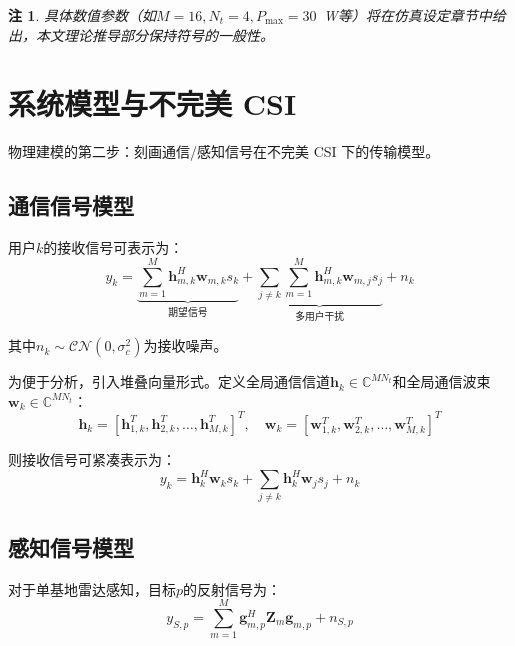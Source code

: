 \documentclass[12pt,a4paper]{article}
\newtheorem{remark}{注}
\newcommand{\vect}[1]{\mathbf{#1}}
\newcommand{\mat}[1]{\mathbf{#1}}
\begin{document}
\begin{remark}
具体数值参数（如$M=16, N_t=4, P_{\max}=30$~W等）将在仿真设定章节中给出，本文理论推导部分保持符号的一般性。
\end{remark}

\section{系统模型与不完美 CSI}

物理建模的第二步：刻画通信/感知信号在不完美 CSI 下的传输模型。

\subsection{通信信号模型}

用户$k$的接收信号可表示为：
\begin{equation}
y_k = \underbrace{\sum_{m=1}^M \vect{h}_{m,k}^H \vect{w}_{m,k} s_k}_{\text{期望信号}} + \underbrace{\sum_{j \neq k} \sum_{m=1}^M \vect{h}_{m,k}^H \vect{w}_{m,j} s_j}_{\text{多用户干扰}} + n_k
\end{equation}

其中$n_k \sim \mathcal{CN}(0, \sigma_c^2)$为接收噪声。

为便于分析，引入堆叠向量形式。定义全局通信信道$\vect{h}_k \in \mathbb{C}^{MN_t}$和全局通信波束$\vect{w}_k \in \mathbb{C}^{MN_t}$：
\begin{equation}
\vect{h}_k = [\vect{h}_{1,k}^T, \vect{h}_{2,k}^T, \ldots, \vect{h}_{M,k}^T]^T, \quad
\vect{w}_k = [\vect{w}_{1,k}^T, \vect{w}_{2,k}^T, \ldots, \vect{w}_{M,k}^T]^T
\end{equation}

则接收信号可紧凑表示为：
\begin{equation}
y_k = \vect{h}_k^H \vect{w}_k s_k + \sum_{j \neq k} \vect{h}_k^H \vect{w}_j s_j + n_k
\end{equation}

\subsection{感知信号模型}

对于单基地雷达感知，目标$p$的反射信号为：
\begin{equation}
y_{S,p} = \sum_{m=1}^M \vect{g}_{m,p}^H \mat{Z}_m \vect{g}_{m,p} + n_{S,p}
\end{equation}
\end{document}
